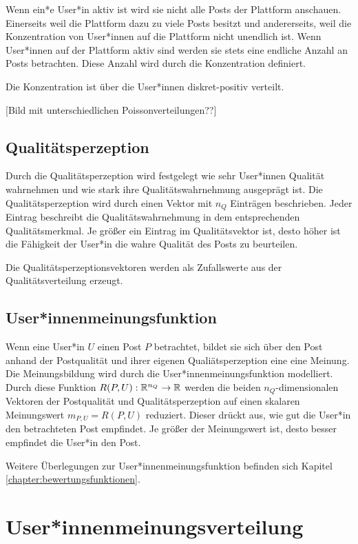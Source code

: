 Wenn ein*e User*in aktiv ist wird sie nicht alle Posts der Plattform anschauen. Einerseits weil die Plattform dazu zu viele Posts besitzt und andererseits, weil die Konzentration von User*innen auf die Plattform nicht unendlich ist. Wenn User*innen auf der Plattform aktiv sind werden sie  stets eine endliche Anzahl an Posts betrachten. Diese Anzahl wird durch die Konzentration definiert.

Die Konzentration ist über die User*innen diskret-positiv verteilt.

[Bild mit unterschiedlichen Poissonverteilungen??]

\subsection{Qualitätsperzeption}
\label{uqualitaet}

Durch die Qualitätsperzeption wird festgelegt wie sehr User*innen Qualität wahrnehmen und wie stark ihre Qualitätswahrnehmung ausgeprägt ist. Die Qualitätsperzeption wird durch einen Vektor mit $n_Q$  Einträgen beschrieben. Jeder Eintrag beschreibt die Qualitätswahrnehmung in dem entsprechenden Qualitätsmerkmal. Je größer ein Eintrag im Qualitätsvektor ist, desto höher ist die Fähigkeit der User*in die wahre Qualität des Posts zu beurteilen.

Die Qualitätsperzeptionsvektoren werden als Zufallswerte aus der Qualitätsverteilung erzeugt.

\subsection{User*innenmeinungsfunktion}

Wenn eine User*in $U$ einen Post $P$ betrachtet, bildet sie sich über den Post anhand der Postqualität und ihrer eigenen Qualiätsperzeption eine eine Meinung. Die Meinungsbildung wird durch die User*innenmeinungsfunktion modelliert. Durch diese Funktion $R(P,U): \mathbb{R}^{n_Q} \rightarrow \mathbb{R} $ werden die beiden $n_Q$-dimensionalen Vektoren der Postqualität und Qualitätsperzeption auf einen skalaren Meinungswert $m_{P,U} = R(P,U)$ reduziert. Dieser drückt aus, wie gut die User*in den betrachteten Post empfindet. Je größer der Meinungswert ist, desto besser empfindet die User*in den Post.

Weitere Überlegungen zur User*innenmeinungsfunktion befinden sich Kapitel \ref{chapter:bewertungsfunktionen}.

\section{User*innenmeinungsverteilung} %


